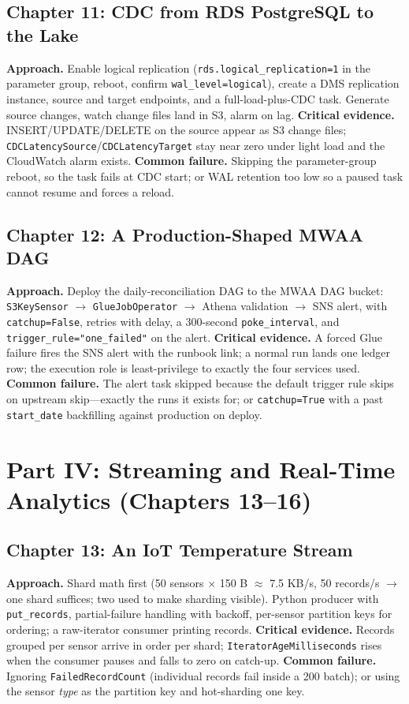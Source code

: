 \subsection{Chapter 11: CDC from RDS PostgreSQL to the Lake}
\textbf{Approach.} Enable logical replication (\texttt{rds.logical\_replication=1} in the
parameter group, reboot, confirm \texttt{wal\_level=logical}), create a DMS replication instance,
source and target endpoints, and a full-load-plus-CDC task. Generate source changes, watch change
files land in S3, alarm on lag.
\textbf{Critical evidence.} INSERT/UPDATE/DELETE on the source appear as S3 change files;
\texttt{CDCLatencySource}/\texttt{CDCLatencyTarget} stay near zero under light load and the
CloudWatch alarm exists.
\textbf{Common failure.} Skipping the parameter-group reboot, so the task fails at CDC start; or
WAL retention too low so a paused task cannot resume and forces a reload.

\subsection{Chapter 12: A Production-Shaped MWAA DAG}
\textbf{Approach.} Deploy the daily-reconciliation DAG to the MWAA DAG bucket:
\texttt{S3KeySensor} $\rightarrow$ \texttt{GlueJobOperator} $\rightarrow$ Athena validation
$\rightarrow$ SNS alert, with \texttt{catchup=False}, retries with delay, a 300-second
\texttt{poke\_interval}, and \texttt{trigger\_rule="one\_failed"} on the alert.
\textbf{Critical evidence.} A forced Glue failure fires the SNS alert with the runbook link;
a normal run lands one ledger row; the execution role is least-privilege to exactly the four
services used.
\textbf{Common failure.} The alert task skipped because the default trigger rule skips on
upstream skip---exactly the runs it exists for; or \texttt{catchup=True} with a past
\texttt{start\_date} backfilling against production on deploy.

\section{Part IV: Streaming and Real-Time Analytics (Chapters 13--16)}
\subsection{Chapter 13: An IoT Temperature Stream}
\textbf{Approach.} Shard math first (50 sensors $\times$ 150 B $\approx$ 7.5 KB/s, 50
records/s $\rightarrow$ one shard suffices; two used to make sharding visible). Python producer
with \texttt{put\_records}, partial-failure handling with backoff, per-sensor partition keys for
ordering; a raw-iterator consumer printing records.
\textbf{Critical evidence.} Records grouped per sensor arrive in order per shard;
\texttt{IteratorAgeMilliseconds} rises when the consumer pauses and falls to zero on catch-up.
\textbf{Common failure.} Ignoring \texttt{FailedRecordCount} (individual records fail inside a
200 batch); or using the sensor \emph{type} as the partition key and hot-sharding one key.

